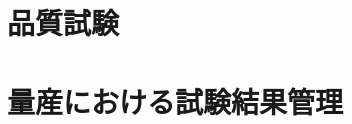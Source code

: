 \subsection{}

\section{品質試験}
\label{sec:QC}

\subsection{}

\section{量産における試験結果管理}
\label{sec:}



\newpage
